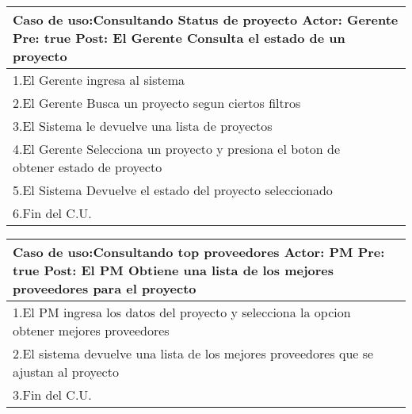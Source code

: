\begin{longtable}{|p{}|p{}|}
    \hline
    \multicolumn{2}{|p{16cm}|}{
        \textbf{Caso de uso:}Consultando Status de proyecto\newline
        \textbf{Actor:} Gerente\newline
        \textbf{Pre: }true\newline
        \textbf{Post:}  El Gerente Consulta el estado de un proyecto
    }\\
    \hline
    1.El Gerente ingresa al sistema & \\
    \hline
    2.El Gerente Busca un proyecto segun ciertos filtros&    \\
    \hline
    3.El Sistema le devuelve una lista de proyectos& \\
    \hline
    4.El Gerente Selecciona un proyecto y presiona el boton de obtener estado de proyecto&\\
    \hline
    5.El Sistema Devuelve el estado del proyecto seleccionado &\\
    \hline
    6.Fin del C.U.&\\
    \hline
\end{longtable}


\begin{longtable}{|p{}|p{}|}
    \hline
    \multicolumn{2}{|p{16cm}|}{
        \textbf{Caso de uso:}Consultando top proveedores \newline
        \textbf{Actor:} PM \newline
        \textbf{Pre: }true\newline
        \textbf{Post:}  El PM Obtiene una lista de los mejores proveedores para el proyecto
    }\\
    \hline
    1.El PM ingresa los datos del proyecto y selecciona la opcion obtener mejores proveedores& \\
    \hline
    2.El sistema devuelve una lista de los mejores proveedores que se ajustan al proyecto&    \\
    \hline
    3.Fin del C.U.&\\
    \hline
\end{longtable}
